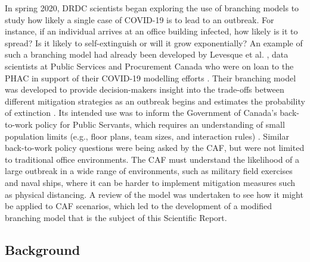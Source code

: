 \documentclass[sr]{drdc-report}
\begin{document}


In spring 2020, DRDC scientists began exploring the use of branching models to study how likely a single case of COVID-19 is to lead to an outbreak. For instance, if an individual arrives at an office building infected, how likely is it to spread? Is it likely to self-extinguish or will it grow exponentially? An example of such a branching model had already been developed by Levesque et al. \cite{LevesquePaper}, data scientists at Public Services and Procurement Canada who were on loan to the PHAC in support of their COVID-19 modelling efforts \cite{LevesquePres}. Their branching model was developed to provide decision-makers insight into the trade-offs between different mitigation strategies as an outbreak begins and estimates the probability of extinction \cite{LevesquePaper}. Its intended use was to inform the Government of Canada’s back-to-work policy for Public Servants, which requires an understanding of small population limits (e.g., floor plans, team sizes, and interaction rules) \cite{LevesquePres}. Similar back-to-work policy questions were being asked by the CAF, but were not limited to traditional office environments. The CAF must understand the likelihood of a large outbreak in a wide range of environments, such as military field exercises and naval ships, where it can be harder to implement mitigation measures such as physical distancing. A review of the model was undertaken to see how it might be applied to CAF scenarios, which led to the development of a modified branching model that is the subject of this Scientific Report. 
 

\subsection{Background} 
\end{document}
